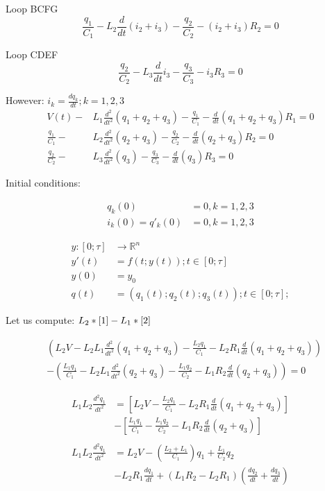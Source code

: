 \documentclass[10pt,a4paper]{article}
\begin{document}
Loop BCFG
	\begin{equation*}
	\frac{q_1}{C_1}-L_2 \frac{d}{dt}(i_2+i_3)-\frac{q_2}{C_2}-(i_2+i_3)R_2=0
	\end{equation*}

Loop CDEF
	\begin{equation*}
	\frac{q_2}{C_2}-L_3 \frac{d}{dt}i_3 -\frac{q_3}{C_3}-i_3 R_3=0
	\end{equation*}

However: $i_k = \frac{dq_k}{dt} ; k=1,2,3$
\begin{align}
	V(t)-&L_1 \frac{d^2}{dt^2}(q_1 + q_2 + q_3)-\frac{q_1}{C_1} -\frac{d}{dt}(q_1 + q_2 + q_3)R_1=0 \label{1}\\ 
	\frac{q_1}{C_1}-&L_2 \frac{d^2}{dt^2}(q_2+q_3)-\frac{q_2}{C_2} -\frac{d}{dt}(q_2+q_3)R_2=0 \label{2} \\ 
	\frac{q_2}{C_2}-&L_3 \frac{d^2}{dt^2}(q_3)-\frac{q_3}{C_3} -\frac{d}{dt}(q_3)R_3=0 \label{3}	
\end{align}

Initial conditions:
\begin{center}
	\begin{align*}
	q_k(0)&=0, k=1,2,3\\
	i_k(0)=q'_k(0)&=0, k=1,2,3
	\end{align*}
\end{center}

\begin{align*}
	y:\left[0;\tau \right]&\rightarrow \mathbb{R}^n\\
	y'(t)&=f\left(t;y(t)\right) ; t\in \left[0;\tau \right]\\
	y(0)&=y_0\\
	q(t)&=(q_1(t);q_2(t);q_3(t)) ; t\in \left[0;\tau \right];
\end{align*}

Let us compute: $L_2*\eqref{1} - L_1*\eqref{2}$

\begin{align*}
	&\left( L_2 V-L_2 L_1 \frac{d^2}{dt^2}(q_1+q_2+q_3)-\frac{L_2 q_1}{C_1}-L_2 R_1\frac{d}{dt}(q_1+q_2+q_3)\right)\\ 
	&-\left( \frac{L_1 q_1}{C_1} -L_2 L_1 \frac{d^2}{dt^2}(q_2+q_3)-\frac{L_1 q_2}{C_2} -L_1 R_2 \frac{d}{dt}(q_2+q_3)\right)=0
\end{align*}

\begin{align*}
	L_1 L_2 \frac{d^2 q_1}{dt^2}&=\left[ L_2 V -\frac{L_2 q_1}{C_1}-L_2 R_1 \frac{d}{dt}(q_1+q_2+q_3)\right]\\
	&-\left[\frac{L_1 q_1}{C_1}-\frac{L_1 q_2}{C_2}-L_1 R_2 \frac{d}{dt}(q_2+q_3)\right]\\
	\\    
	L_1 L_2 \frac{d^2 q_1}{dt^2}&=L_2 V -\left(\frac{L_2+L_1}{C_1}\right)q_1+\frac{L_1}{C_2}q_2\\
	&-L_2 R_1\frac{dq_1}{dt}+(L_1 R_2-L_2 R_1)\left(\frac{dq_2}{dt}+\frac{dq_3}{dt}\right)
\end{align*}
\end{document}
